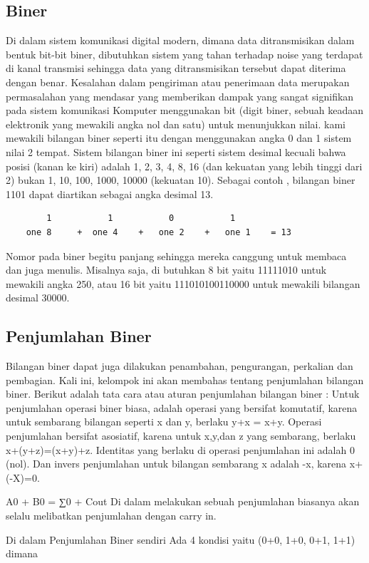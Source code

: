 \subsection {Biner}
Di dalam sistem komunikasi digital modern, dimana data ditransmisikan dalam bentuk bit-bit biner, dibutuhkan sistem yang tahan terhadap noise yang terdapat di kanal transmisi sehingga data yang ditransmisikan tersebut dapat diterima dengan benar. Kesalahan dalam pengiriman atau penerimaan data merupakan permasalahan yang mendasar yang memberikan dampak yang sangat signifikan pada sistem komunikasi
Komputer menggunakan bit (digit biner, sebuah keadaan elektronik yang mewakili angka nol dan satu) untuk menunjukkan nilai. kami mewakili bilangan biner seperti itu dengan menggunakan angka 0 dan 1 sistem nilai 2 tempat. Sistem bilangan biner ini seperti sistem desimal kecuali bahwa posisi (kanan ke kiri) adalah 1, 2, 3, 4, 8, 16 (dan kekuatan yang lebih tinggi dari 2) bukan 1, 10, 100, 1000, 10000 (kekuatan 10). Sebagai contoh , bilangan biner 1101 dapat diartikan sebagai angka desimal 13.
	\begin{verbatim}
		1			1			0			1
	one 8	  +	 one 4	  +	  one 2    +   one 1 	= 13
	\end{verbatim}
Nomor pada  biner begitu panjang sehingga mereka canggung  untuk membaca dan juga menulis. Misalnya saja, di butuhkan 8 bit yaitu  11111010 untuk mewakili angka 250, atau 16 bit yaitu 111010100110000 untuk mewakili bilangan desimal 30000.


\subsection {Penjumlahan Biner}
Bilangan biner dapat juga dilakukan penambahan, pengurangan, perkalian dan pembagian. Kali ini, kelompok ini akan membahas tentang penjumlahan bilangan biner. Berikut adalah tata cara atau aturan penjumlahan bilangan biner :
Untuk penjumlahan operasi biner biasa, adalah operasi yang bersifat komutatif, karena untuk sembarang bilangan seperti x dan y, berlaku y+x = x+y. Operasi penjumlahan bersifat asosiatif, karena untuk x,y,dan z yang sembarang, berlaku x+(y+z)=(x+y)+z. Identitas yang berlaku di operasi penjumlahan ini adalah 0 (nol). Dan invers penjumlahan untuk bilangan sembarang x adalah -x, karena x+(-X)=0.


A0 + B0 = ∑0 + Cout
Di dalam melakukan sebuah penjumlahan biasanya akan selalu melibatkan penjumlahan dengan carry in.

Di dalam Penjumlahan Biner sendiri Ada 4 kondisi yaitu
(0+0, 1+0, 0+1, 1+1) dimana

